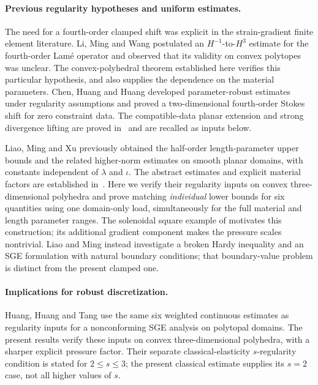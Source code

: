 \documentclass[11pt,a4paper]{article}
\theoremstyle{remark}
\numberwithin{equation}{section}
\begin{document}
\paragraph{Previous regularity hypotheses and uniform estimates.}
The need for a fourth-order clamped shift was explicit in the strain-gradient
finite element literature. Li, Ming and Wang \cite[Hypothesis~1]{LiMingWang2021Korn}
postulated an $H^{-1}$-to-$H^3$ estimate for the fourth-order Lam\'e
operator and observed that its validity on convex polytopes was unclear.
The convex-polyhedral theorem established here verifies this particular
hypothesis, and also supplies the dependence on the material parameters.
Chen, Huang and Huang \cite{ChenHuangHuang2023} developed parameter-robust estimates
under regularity assumptions and proved a two-dimensional fourth-order
Stokes shift for zero constraint data. The compatible-data planar extension and strong divergence lifting are
proved in~\cite[Propositions~2.8--2.9 and Lemma~2.7]{PolygonCompanion2026}
and are recalled as inputs below.

Liao, Ming and Xu \cite[Theorem~2.9]{LiaoMingXu2023} previously obtained
the half-order length-parameter upper bounds and the related higher-norm
estimates on smooth planar domains, with constants independent of
$\lambda$ and $\iota$. The abstract estimates and explicit material factors are established
in~\cite{PolygonCompanion2026}. Here we verify their regularity inputs
on convex three-dimensional polyhedra and prove matching
\emph{individual} lower bounds for six quantities using one domain-only
load, simultaneously for the full material and length parameter ranges.
The solenoidal square example of \cite{ChenHuangHuang2023} motivates this construction;
its additional gradient component makes the pressure scales nontrivial.
Liao and Ming \cite{LiaoMing2025} instead investigate a broken Hardy
inequality and an SGE formulation with natural boundary conditions; that
boundary-value problem is distinct from the present clamped one.

\paragraph{Implications for robust discretization.}
Huang, Huang and Tang \cite[Section~2.3, (2.7)--(2.8)]{HuangHuangTang2026robust}
use the same six weighted continuous estimates as regularity inputs for
a nonconforming SGE analysis on polytopal domains. The present results
verify these inputs on convex three-dimensional polyhedra, with a
sharper explicit pressure factor. Their separate classical-elasticity
$s$-regularity condition is stated for $2\le s\le3$; the present
classical estimate supplies its $s=2$ case, not all higher values of $s$.
\end{document}
